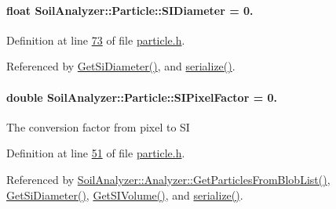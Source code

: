 \hypertarget{class_soil_analyzer_1_1_particle_a43f6f6107ddd2987f8c7a1ef25ffedaa}{}
\paragraph[{S\+I\+Diameter}]{\setlength{\rightskip}{0pt plus 5cm}float Soil\+Analyzer\+::\+Particle\+::\+S\+I\+Diameter = 0.\hspace{0.3cm}{\ttfamily [private]}}\label{class_soil_analyzer_1_1_particle_a43f6f6107ddd2987f8c7a1ef25ffedaa}


Definition at line \hyperlink{particle_8h_source_l00073}{73} of file \hyperlink{particle_8h_source}{particle.\+h}.



Referenced by \hyperlink{particle_8cpp_source_l00068}{Get\+Si\+Diameter()}, and \hyperlink{particle_8h_source_l00083}{serialize()}.

\hypertarget{class_soil_analyzer_1_1_particle_a5156110e9617d656a7b878a8a0fbe024}{}
\paragraph[{S\+I\+Pixel\+Factor}]{\setlength{\rightskip}{0pt plus 5cm}double Soil\+Analyzer\+::\+Particle\+::\+S\+I\+Pixel\+Factor = 0.}\label{class_soil_analyzer_1_1_particle_a5156110e9617d656a7b878a8a0fbe024}
The conversion factor from pixel to S\+I 

Definition at line \hyperlink{particle_8h_source_l00051}{51} of file \hyperlink{particle_8h_source}{particle.\+h}.



Referenced by \hyperlink{analyzer_8cpp_source_l00322}{Soil\+Analyzer\+::\+Analyzer\+::\+Get\+Particles\+From\+Blob\+List()}, \hyperlink{particle_8cpp_source_l00068}{Get\+Si\+Diameter()}, \hyperlink{particle_8cpp_source_l00057}{Get\+S\+I\+Volume()}, and \hyperlink{particle_8h_source_l00083}{serialize()}.

\hypertarget{class_soil_analyzer_1_1_particle_a62edcdac484d0822a098ac58b9927150}{}
